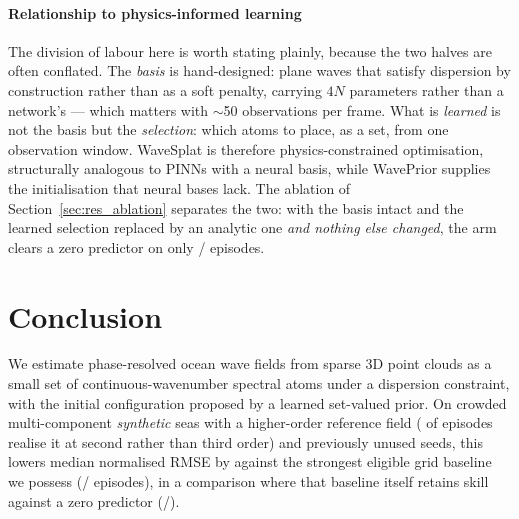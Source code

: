 \documentclass[review]{elsarticle}
\begin{document}
\paragraph{Relationship to physics-informed learning}
The division of labour here is worth stating plainly, because the two halves are
often conflated. The \emph{basis} is hand-designed: plane waves that satisfy
dispersion by construction rather than as a soft penalty, carrying $4N$ parameters
rather than a network's --- which matters with $\sim$50 observations per frame. What
is \emph{learned} is not the basis but the \emph{selection}: which atoms to place,
as a set, from one observation window. WaveSplat is therefore physics-constrained
optimisation, structurally analogous to PINNs with a neural basis, while WavePrior
supplies the initialisation that neural bases lack. The ablation of
Section~\ref{sec:res_ablation} separates the two: with the basis intact and the
learned selection replaced by an analytic one \emph{and nothing else changed}, the
arm clears a zero predictor on only \BTwentyTwoAnaZero{}/\BTwentyTwoN{} episodes.

\section{Conclusion}
\label{sec:conclusion}


We estimate phase-resolved ocean wave fields from sparse 3D point clouds as a small
set of continuous-wavenumber spectral atoms under a dispersion constraint, with the
initial configuration proposed by a learned set-valued prior.
On crowded multi-component \emph{synthetic} seas with a higher-order reference field
(\HosCrowdedDegraded{} of \HosCrowdedN{} episodes realise it at second rather than
third order) and previously unused
seeds, this lowers median normalised RMSE by \BTwelveRel{} against the strongest
eligible grid baseline we possess (\BTwelveBetter{}/\BTwelveN{} episodes), in a
comparison where that baseline itself retains skill against a zero predictor
(\BTwelveCmpBetter{}/\BTwelveCmpN{}).
\end{document}
